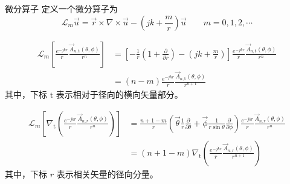 \begin{definition}{微分算子}
    定义一个微分算子为
    \begin{equation}
        \mathcal{L}_m \vec{u}
        =\vec{r}\times\nabla \times\vec{u}
        -\left(jk+\frac{m}{r}\right)\vec{u}
        \qquad
        m=0,1,2,\cdots
    \end{equation}
\end{definition}

\begin{lemma}
    \begin{equation}
        \begin{aligned}
            \mathcal{L}_m \left[
                \frac{e^{-jkr}}{r}
                \frac{\vec{A}_{n,\text{t}}(\theta, \phi)}{r^n}
            \right]
            &=
            \left[
                -\frac{1}{r}\left(
                    1+\frac{\partial}{\partial r}
                \right)
                -\left(
                    jk+\frac{m}{r}
                \right)
            \right]
            \frac{e^{-jkr}}{r}
            \frac{\vec{A}_{n,\text{t}}(\theta, \phi)}{r^n}\\
            &=(n-m)\frac{e^{-jkr}}{r}
            \frac{\vec{A}_{n,\text{t}}(\theta, \phi)}{r^{n+1}}    
        \end{aligned}
    \end{equation}
    其中，下标 $\text{t}$ 表示相对于径向的横向矢量部分。
\end{lemma}

\begin{lemma}
    \begin{equation}
        \begin{aligned}
            \mathcal{L}_m \left[
                \nabla_{\text{t}}\left(
                    \frac{e^{-jkr}}{r}
                    \frac{\vec{A}_{n,r}(\theta, \phi)}{r^n}
                \right)
            \right]
            &=
            \frac{n+1-m}{r}
            \left(
                \vec{\theta}\frac{1}{r}\frac{\partial}{\partial \theta}
                +\vec{\phi}\frac{1}{r\sin\theta}\frac{\partial}{\partial \phi}
            \right)
            \frac{e^{-jkr}}{r}
            \frac{\vec{A}_{n,r}(\theta, \phi)}{r^n}\\
            &=(n+1-m)\nabla_{\text{t}}\left(
                \frac{e^{-jkr}}{r}
                \frac{\vec{A}_{n,r}(\theta, \phi)}{r^{n+1}}
            \right)
        \end{aligned}
    \end{equation}
    其中，下标 $r$ 表示相关矢量的径向分量。
\end{lemma}

